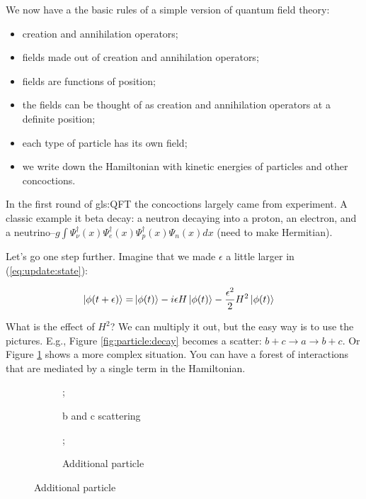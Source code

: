 \documentclass[]{article}
\begin{document}
We now have a the basic rules of a simple version of quantum field theory:
\begin{itemize}
	\item creation and annihilation operators;
	\item fields made out of creation and annihilation operators;
	\item fields are functions of position;
	\item the fields can be thought of as creation and annihilation operators at a definite position;
	\item each type of particle has its own field;
	\item we write down the Hamiltonian with kinetic energies of particles and other concoctions. 
\end{itemize}

In the first round of \gls{gls:QFT} the concoctions largely came from experiment. A classic example it beta decay: a neutron decaying into a proton, an electron, and a neutrino--$g \int \Psi^\dagger_{\nu}(x) \Psi^\dagger_e(x) \Psi^\dagger_p(x) \Psi_n(x) dx$ (need to make Hermitian).

Let's go one step further. Imagine that we made $\epsilon$ a little larger in (\ref{eq:update:state}):

\begin{align*}
	\ket{\phi(t+\epsilon)} =& \ket{\phi(t)} -i \epsilon H \ket{\phi(t)} - \frac{\epsilon^2}{2} H^2 \ket{\phi(t)}
\end{align*}

What is the effect of $H^2$? We can multiply it out, but the easy way is to use the pictures. E.g., Figure \ref{fig:particle:decay} becomes a scatter: $b+c \rightarrow a \rightarrow b + c$. Or Figure \ref{fig:scatter:annihilate} shows a more complex situation. You can have a forest of interactions that are mediated by a single term in the Hamiltonian. 

\begin{figure}[H]
	\caption{$\Psi^\dagger_c\Psi^\dagger_b\Psi_a\Psi^\dagger_a\Psi_b\Psi_c$}
	\begin{subfigure}[t]{0.45\textwidth}
		\begin{center}
			\caption{b and c scattering}\label{fig:scatter:annihilate}
			;
		\end{center}
	\end{subfigure}
	\hfill
	\begin{subfigure}[t]{0.45\textwidth}
		\caption{Additional particle}\label{fig:additional:particle}
		;
	\end{subfigure}
\end{figure}
\end{document}
